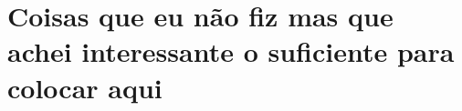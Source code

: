 \chapter{Coisas que eu não fiz mas que achei interessante o suficiente para colocar aqui}


\lipsum[31]